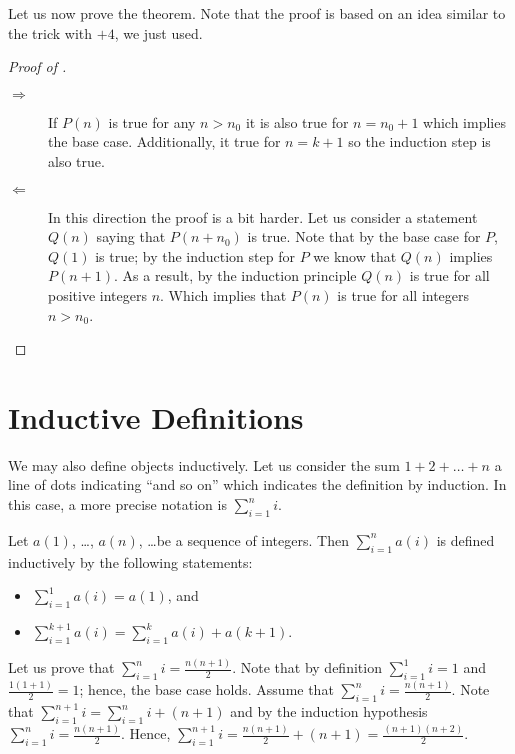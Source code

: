 Let us now prove the theorem. Note that the proof is based on an idea similar
to the trick with $+4$, we just used.
\begin{proof}[Proof of ]
  \begin{description}
    \item[$\Rightarrow$] If $P(n)$ is true for any $n > n_0$ it is also true
      for $n = n_0 + 1$ which implies the base case. Additionally, it true for
      $n = k + 1$ so the induction step is also true.
    \item[$\Leftarrow$] In this direction the proof is a bit harder. Let us
      consider a statement $Q(n)$ saying that $P(n + n_0)$ is true. Note that
      by the base case for $P$, $Q(1)$ is true; by the induction step for $P$
      we know that $Q(n)$ implies $P(n + 1)$. As a result, by the induction
      principle $Q(n)$ is true for all positive integers $n$. Which implies
      that $P(n)$ is true for all integers $n > n_0$.
  \end{description}
\end{proof}

\section{Inductive Definitions}

We may also define objects inductively. Let us consider the sum
$1 + 2 + \dots + n$ a line of dots indicating ``and so on'' which indicates the
definition by induction. In this case, a more precise notation is
$\sum_{i = 1}^n i$.

\begin{definition}
  Let $a(1)$, \dots, $a(n)$, \dots be a sequence of integers. Then
  $\sum_{i = 1}^n a(i)$ is defined inductively by the following
  statements:
  \begin{itemize}
    \item $\sum_{i = 1}^1 a(i) = a(1)$, and
    \item $\sum_{i = 1}^{k + 1} a(i) =
        \sum_{i = 1}^k a(i) + a(k + 1)$.
  \end{itemize}
\end{definition}

Let us prove that $\sum_{i = 1}^n i = \frac{n (n + 1)}{2}$.
Note that by definition $\sum_{i = 1}^1 i = 1$ and
$\frac{1 (1 + 1)}{2} = 1$; hence, the base case holds. Assume that
$\sum_{i = 1}^n i = \frac{n (n + 1)}{2}$. Note that
$\sum_{i = 1}^{n + 1} i = \sum_{i = 1}^n i + (n + 1)$ and by the
induction hypothesis $\sum_{i = 1}^n i = \frac{n (n + 1)}{2}$.
Hence, $\sum_{i = 1}^{n + 1} i = \frac{n (n + 1)}{2} + (n + 1) =
\frac{(n + 1)(n + 2)}{2}$.

